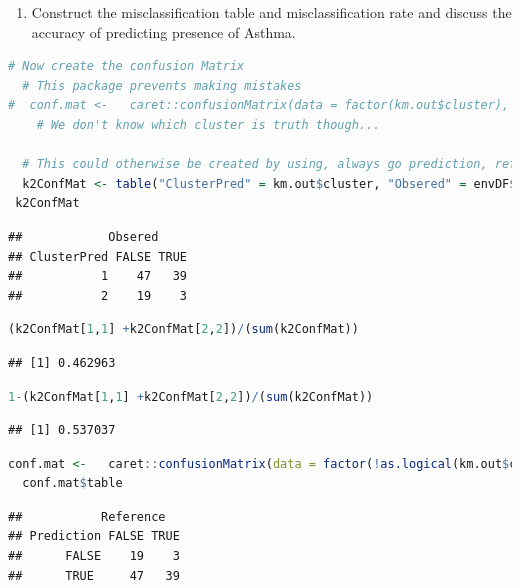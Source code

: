 \documentclass[
]{article}
\providecommand{\tightlist}{%
  \setlength{\itemsep}{0pt}\setlength{\parskip}{0pt}}
\begin{document}
\begin{enumerate}
\def\labelenumi{\alph{enumi}.}
\setcounter{enumi}{2}
\tightlist
\item
  Construct the misclassification table and misclassification rate and
  discuss the accuracy of predicting presence of Asthma.
\end{enumerate}

\begin{lstlisting}[language=R]
# Now create the confusion Matrix
  # This package prevents making mistakes
#  conf.mat <-   caret::confusionMatrix(data = factor(km.out$cluster), reference = factor(envDF$asthma))
    # We don't know which cluster is truth though...

  # This could otherwise be created by using, always go prediction, reference as a standard
  k2ConfMat <- table("ClusterPred" = km.out$cluster, "Obsered" = envDF$asthma)
 k2ConfMat
\end{lstlisting}

\begin{lstlisting}
##            Obsered
## ClusterPred FALSE TRUE
##           1    47   39
##           2    19    3
\end{lstlisting}

\begin{lstlisting}[language=R]
(k2ConfMat[1,1] +k2ConfMat[2,2])/(sum(k2ConfMat))
\end{lstlisting}

\begin{lstlisting}
## [1] 0.462963
\end{lstlisting}

\begin{lstlisting}[language=R]
 1-(k2ConfMat[1,1] +k2ConfMat[2,2])/(sum(k2ConfMat)) 
\end{lstlisting}

\begin{lstlisting}
## [1] 0.537037
\end{lstlisting}

\begin{lstlisting}[language=R]
  conf.mat <-   caret::confusionMatrix(data = factor(!as.logical(km.out$cluster-1)), reference = factor(envDF$asthma))
  conf.mat$table
\end{lstlisting}

\begin{lstlisting}
##           Reference
## Prediction FALSE TRUE
##      FALSE    19    3
##      TRUE     47   39
\end{lstlisting}
\end{document}
